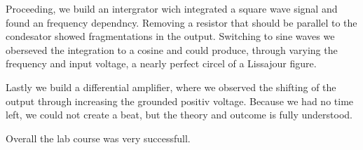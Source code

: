 \documentclass[a4paper,10pt]{article}
\numberwithin{equation}{section}
\begin{document}
\begin{multicols}{2}
	Proceeding, we build an intergrator wich integrated a square wave signal and found an frequency dependncy. Removing a resistor that should be parallel to the condesator showed fragmentations in the output. Switching to sine waves we oberseved the integration to a cosine and could produce, through varying the frequency and input voltage, a nearly perfect circel of a Lissajour figure.

	Lastly we build a differential amplifier, where we observed the shifting of the output through increasing the grounded positiv voltage. Because we had no time left, we could not create a beat, but the theory and outcome is fully understood.

	Overall the lab course was very successfull.

\end{multicols}


\clearpage
\listoffigures
\listoftables



\end{document}
